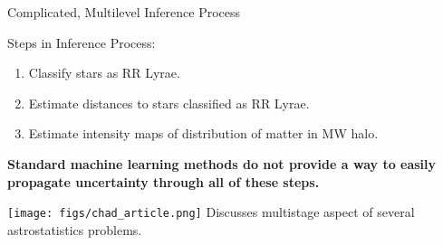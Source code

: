 \documentclass[12pt]{beamer}
\begin{document}
\begin{frame}{Complicated, Multilevel Inference Process}

  Steps in Inference Process:
  \begin{enumerate}
  \item Classify stars as RR Lyrae.
  \item Estimate distances to stars classified as RR Lyrae.
  \item Estimate intensity maps of distribution of matter in MW halo.
  \end{enumerate}

  \begin{center}
    \textbf{Standard machine learning methods do not provide a way to easily propagate uncertainty through all of these steps.}
  \end{center}

  \begin{center}
    \texttt{[image: figs/chad\_article.png]}
    {\small Discusses multistage aspect of several astrostatistics problems.}
  \end{center}
  
\end{frame}
 




\end{document}

